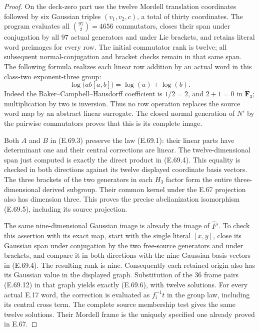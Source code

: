 \begin{proof}
On the deck-zero part use the twelve Mordell
translation coordinates followed by six Gaussian
triples $(v_1,v_2,c)$, a total of thirty coordinates.
The program evaluates all $\binom{97}{2}=4656$
commutators, closes their span under conjugation by
all $97$ actual generators and under Lie brackets,
and retains literal word preimages for every row.
The initial commutator rank is twelve; all subsequent
normal-conjugation and bracket checks remain in that
same span. The following formula realizes each
linear row addition by an actual word in this
class-two exponent-three group:
\[
                  \log\bigl(ab[a,b]\bigr)=\log(a)+\log(b).
 \tag{E.69.13}
\]
Indeed the Baker--Campbell--Hausdorff coefficient is
$1/2=2$, and $2+1=0$ in $\mathbf F_3$; multiplication
by two is inversion. Thus no row operation replaces
the source word map by an abstract linear surrogate.
The closed normal generation of $N'$ by the pairwise
commutators proves that this is its complete image.

Both $A$ and $B$ in (E.69.3) preserve the law (E.69.1):
their linear parts have determinant one and their
central corrections are linear. The twelve-dimensional
span just computed is exactly the direct product in
(E.69.4). This equality is checked in both directions
against its twelve displayed coordinate basis vectors.
The three brackets of the two generators in each
$H_3$ factor form the entire three-dimensional derived
subgroup. Their common kernel under the E.67 projection
also has dimension three. This proves the precise
abelianization isomorphism (E.69.5), including its
source projection.

The same nine-dimensional Gaussian image is already
the image of $\widehat F'$. To check this assertion
with its exact map, start with the single literal
$[x,y]$, close its Gaussian span under conjugation by
the two free-source generators and under brackets,
and compare it in both directions with the nine
Gaussian basis vectors in (E.69.4). The resulting
rank is nine. Consequently each retained origin
also has its Gaussian value in the displayed graph.
Substitution of the $36$ frame pairs (E.69.12) in
that graph yields exactly (E.69.6), with twelve
solutions. For every actual E.17 word, the correction
is evaluated as $f_i^{-1}t$ in the group law, including
its central cross term. The complete source membership
test gives the same twelve solutions. Their Mordell
frame is the uniquely specified one already proved
in E.67.


\end{proof}
